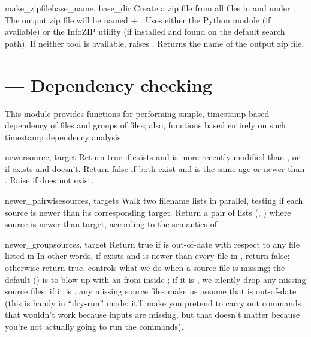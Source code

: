 \documentclass{manual}
\begin{document}
\begin{funcdesc}{make_zipfile}{base_name, base_dir}
Create a zip file from all files in and under .  The output
zip file will be named  + .  Uses either the 
 Python module (if available) or the InfoZIP  
utility (if installed and found on the default search path).  If neither 
tool is available, raises .  
Returns the name of the output zip file.
\end{funcdesc}

\section{ --- Dependency checking}

This module provides functions for performing simple, timestamp-based 
dependency of files and groups of files; also, functions based entirely 
on such timestamp dependency analysis.

\begin{funcdesc}{newer}{source, target}
Return true if  exists and is more recently modified than
, or if  exists and  doesn't.
Return false if both exist and  is the same age or newer 
than .
Raise  if  does not exist.
\end{funcdesc}

\begin{funcdesc}{newer_pairwise}{sources, targets}
Walk two filename lists in parallel, testing if each source is newer
than its corresponding target.  Return a pair of lists (,
) where source is newer than target, according to the semantics
of 
\end{funcdesc}

\begin{funcdesc}{newer_group}{sources, target}
Return true if  is out-of-date with respect to any file
listed in   In other words, if  exists and is newer
than every file in , return false; otherwise return true.
 controls what we do when a source file is missing; the
default () is to blow up with an  from 
inside ;
if it is , we silently drop any missing source files; if it is
, any missing source files make us assume that  is
out-of-date (this is handy in ``dry-run'' mode: it'll make you pretend to
carry out commands that wouldn't work because inputs are missing, but
that doesn't matter because you're not actually going to run the
commands).
\end{funcdesc}
\end{document}
